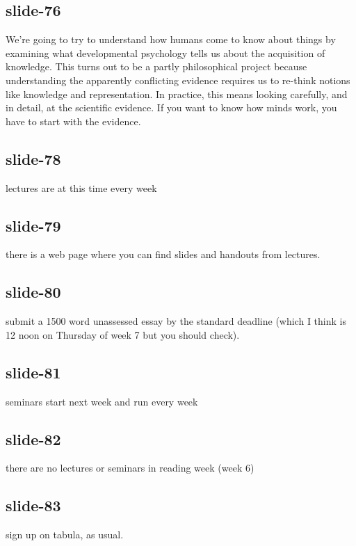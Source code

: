 \documentclass[12pt,\papersize]{extarticle}
\begin{document}
 
 
\subsection{slide-76}
We're going to try to understand how humans come to know about things by examining what developmental psychology tells us about the acquisition of knowledge. This turns out to be a partly philosophical project because understanding the apparently conflicting evidence requires us to re-think notions like knowledge and representation. In practice, this means looking carefully, and in detail, at the scientific evidence. If you want to know how minds work, you have to start with the evidence.
 
 
 
\subsection{slide-78}
lectures are at this time every week
 
 
 
\subsection{slide-79}
there is a web page where you can find slides and handouts from lectures.
 
 
 
\subsection{slide-80}
submit a 1500 word unassessed essay by the standard deadline (which I think is 12 noon on Thursday of week 7 but you should check).
 
 
 
\subsection{slide-81}
seminars start next week and run every week
 
 
 
\subsection{slide-82}
there are no lectures or seminars in reading week (week 6)
 
 
 
\subsection{slide-83}
sign up on tabula, as usual.
 
\end{document}

